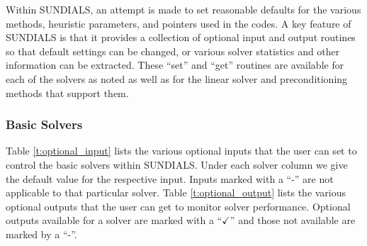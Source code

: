 Within SUNDIALS, an attempt is made to set reasonable defaults for the
various methods, heuristic parameters, and pointers used in the
codes. 
A key feature of SUNDIALS is that it provides a collection of optional
input and output routines so that default settings can be changed, or
various solver statistics and other information can be extracted.
These ``set'' and ``get'' routines are available for each of the solvers as
noted as well as for the linear solver and preconditioning methods that
support them.

\subsubsection*{Basic Solvers} 
Table \ref{t:optional_input} lists the various optional 
inputs that the user can set to control the basic solvers within SUNDIALS.
Under each solver column we give the default value for the respective
input. Inputs marked with a ``-'' are not applicable to that particular 
solver. Table \ref{t:optional_output} lists the various optional 
outputs that the user can get to monitor solver performance.
Optional outputs available for a solver are marked with a ``$\checkmark$''
and those not available are marked by a ``-''.

